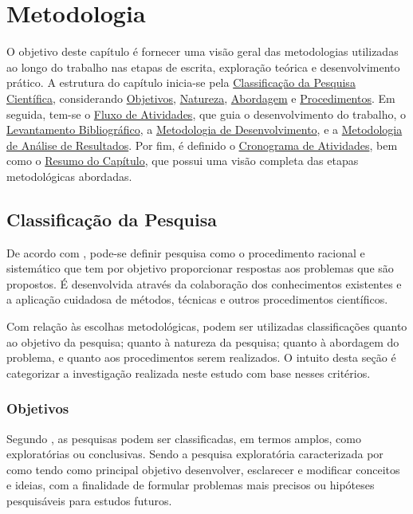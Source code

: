 \chapter[Metodologia]{Metodologia}
\label{chap:Metodologia}

O objetivo deste capítulo é fornecer uma visão geral das metodologias utilizadas ao longo do trabalho nas etapas de escrita, exploração teórica e desenvolvimento prático. 
A estrutura do capítulo inicia-se pela \hyperref[sec:Classificacao da Pesquisa]{Classificação da Pesquisa Científica}, considerando \hyperref[sec:Objetivos2]{Objetivos}, \hyperref[sec:Natureza]{Natureza}, \hyperref[sec:Abordagem]{Abordagem} e \hyperref[sec:Procedimentos]{Procedimentos}. 
Em seguida, tem-se o \hyperref[sec:Fluxo de Atividades]{Fluxo de Atividades}, que guia o desenvolvimento do trabalho, o \hyperref[sec:Levantamento Bibliografico]{Levantamento Bibliográfico}, a \hyperref[sec:Metodologia de Desenvolvimento]{Metodologia de Desenvolvimento}, e a 
\hyperref[sec:Metodologia de Analise de Resultados]{Metodologia de Análise de Resultados}. Por fim, é definido o \hyperref[sec:Cronograma]{Cronograma de Atividades}, bem como o \hyperref[sec:Resumo do Capitulo]{Resumo do Capítulo}, que possui uma visão completa das etapas 
metodológicas abordadas.

\section{Classificação da Pesquisa}
\label{sec:Classificacao da Pesquisa}
De acordo com , pode-se definir pesquisa como o procedimento racional e sistemático que tem por objetivo proporcionar respostas aos problemas que são propostos. É desenvolvida através da colaboração 
dos conhecimentos existentes e a aplicação cuidadosa de métodos, técnicas e outros procedimentos científicos.

Com relação às escolhas metodológicas, podem ser utilizadas classificações quanto ao objetivo da pesquisa; quanto à natureza da pesquisa; quanto à abordagem do problema, e quanto aos procedimentos serem realizados. O intuito desta seção é 
categorizar a investigação realizada neste estudo com base nesses critérios.

\subsection{Objetivos}
\label{sec:Objetivos2}
Segundo , as pesquisas podem ser classificadas, em termos amplos, como exploratórias ou conclusivas. Sendo a pesquisa exploratória caracterizada por  como tendo como principal objetivo 
desenvolver, esclarecer e modificar conceitos e ideias, com a finalidade de formular problemas mais precisos ou hipóteses pesquisáveis para estudos futuros.

